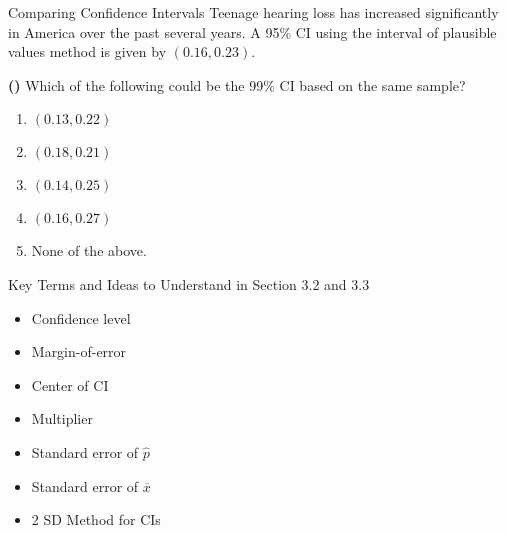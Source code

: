 \documentclass[13pt]{beamer}
\newcounter{count}
\newcommand{\question}{ \textbf{(\decimal{count})} \stepcounter{count}}
\begin{document}
\begin{frame}{Comparing Confidence Intervals}
Teenage hearing loss has increased significantly in America over the past several years. A 95\% CI using the interval of plausible values method is given by $(0.16,0.23)$.\smallskip

%
%

\question Which of the following could be the 99\% CI based on the same sample?
\begin{enumerate}[A]
   \item $(0.13,0.22)$%
   \item $(0.18,0.21)$%
   \item $(0.14,0.25)$%
   \item $(0.16,0.27)$%
   \item None of the above.
\end{enumerate}
\end{frame}



\begin{frame}{Key Terms and Ideas to Understand in Section 3.2 and 3.3}
\begin{multicols}{2}
\begin{itemize}
	\item Confidence level
    \item Margin-of-error
    \item Center of CI
    \item Multiplier
    \item Standard error of $\hat{p}$
    \item Standard error of $\overline{x}$
    \item 2 SD Method for CIs
\end{itemize}
\end{multicols}
\end{frame}
\end{document}

